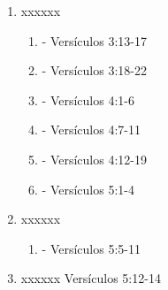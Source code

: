 \documentclass[9pt,letterpaper]{article}
\begin{document}
\begin{enumerate}
\begin{enumerate}
		\end{enumerate}
		\item xxxxxx
		\begin{enumerate}
			\item  - Versículos 3:13-17 
			\item  - Versículos 3:18-22
			\item  - Versículos 4:1-6
			\item  - Versículos 4:7-11
			\item  - Versículos 4:12-19
			\item  - Versículos 5:1-4
		\end{enumerate}
		\item xxxxxx
		\begin{enumerate}
			\item  - Versículos 5:5-11
		\end{enumerate}
		\item xxxxxx Versículos 5:12-14
	\end{enumerate}
\end{document}
